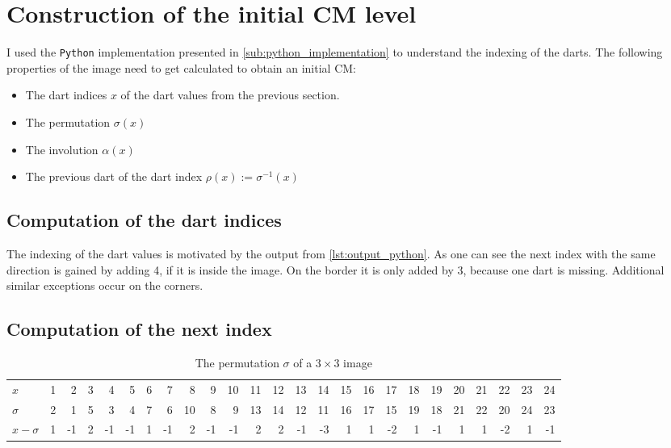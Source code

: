 \documentclass[12pt]{article}
\begin{document}

\section{Construction of the initial CM level}%
\label{sec:construction_of_the_initial_cm_level}

I used the \texttt{Python} implementation presented in \cref{sub:python_implementation} to understand the indexing of the darts.
The following properties of the image need to get calculated to obtain an initial CM\@:
\begin{itemize}
  \item The dart indices \( x \) of the dart values from the previous section.
  \item The permutation \( \sigma(x) \)
  \item The involution \( \alpha(x) \)
  \item The previous dart of the dart index \( \rho(x) := \sigma^{-1}(x)  \)
\end{itemize}

\subsection{Computation of the dart indices}%
\label{sub:computation_of_the_dart_indices}

The indexing of the dart values is motivated by the output from \cref{lst:output_python}. As one can see the next index with the same direction is gained by adding 4, if it is inside the image.
On the border it is only added by 3, because one dart is missing. Additional similar exceptions occur on the corners.


\subsection{Computation of the next index}%
\label{sub:computation_of_the_next_index}

\begin{table}[tb]
  \caption{The permutation \( \sigma \) of a \( 3 \times 3 \) image}%
  \label{tab:permutation}
  \centering

  \tiny
  \begin{tabular}{lrrrrrrrrrrrrrrrrrrrrrrrr}
  \toprule
  \( x \)& 1 & 2 & 3 & 4 & 5 & 6 & 7 & 8 & 9 & 10 & 11 & 12 & 13 & 14 & 15 & 16 & 17 & 18 & 19 & 20 & 21 & 22 & 23 & 24 \\
\( \sigma \)& 2 & 1 & 5 & 3 & 4 & 7 & 6 & 10& 8 & 9 & 13& 14& 12& 11& 16& 17& 15& 19& 18& 21& 22& 20& 24& 23 \\
\( x - \sigma \)& 1 & -1 & 2 & -1 & -1 & 1 & -1 &  2 & -1 & -1 &  2 &  2 &  -1 &  -3 &  1 &  1 &  -2 &  1 &  -1 &  1 &  1 &  -2 &  1 & -1\\
  \bottomrule
  \end{tabular}
\end{table}
\end{document}

